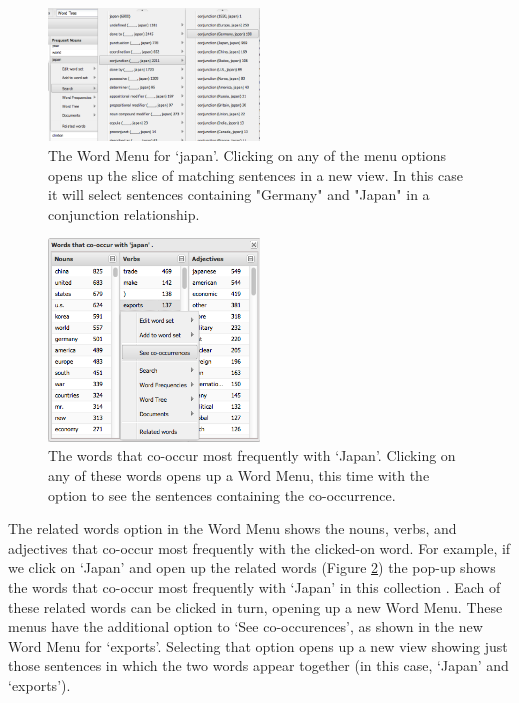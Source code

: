 \documentclass{sig-alternate}
\begin{document}
\begin{figure}[ht!]
\begin{center}
	\includegraphics[width=0.5\textwidth]{fig/intro/08.png}
\end{center}
    \caption{%
      The Word Menu for `japan'.  Clicking on any of the menu options opens up the slice of matching sentences in a new view.  In this case it will select sentences containing "Germany" and "Japan" in a conjunction relationship. \label{fig:intro08}}%
\end{figure}


\begin{figure}[ht!]
\begin{center}
	\includegraphics[width=0.5\textwidth]{fig/intro/09.png}
\end{center}
    \caption{%
 		The words that co-occur most frequently with `Japan'. Clicking on any of these words opens up a Word Menu, this time with the option to see the sentences containing the co-occurrence.
	\label{fig:intro09}}%
\end{figure}


The related words option in the Word Menu shows the nouns, verbs, and adjectives that co-occur most frequently with the clicked-on word. For example, if we click on `Japan' and open up the related words (Figure \ref{fig:intro09}) the pop-up shows the words that co-occur most frequently with `Japan' in this collection \cite{algorithm used}. Each of these related words can be clicked in turn, opening up a new Word Menu. These menus have the additional option to `See co-occurences', as shown in the new Word Menu for `exports'.  Selecting that option opens up a new view showing just those sentences in which the two words appear together  (in this case, `Japan' and `exports').  
\end{document}

